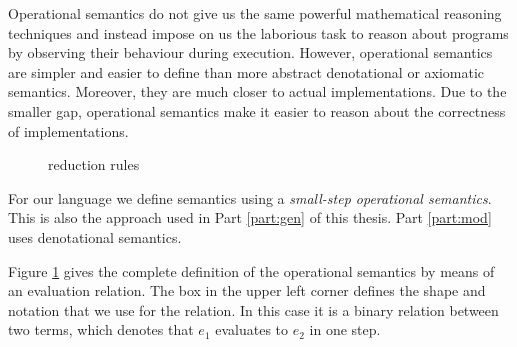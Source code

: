{Operational semantics do not give us the same powerful mathematical reasoning
techniques and instead impose on us the laborious task to reason about programs
by observing their behaviour during execution. However, operational semantics
are simpler and easier to define than more abstract denotational or axiomatic
semantics. Moreover, they are much closer to actual implementations. Due to the
smaller gap, operational semantics make it easier to reason about the
correctness of implementations.

\begin{figure}[t]
  \centering
  \caption{\stlcbool reduction rules}
  \label{fig:intro:stlcbooleval}
\end{figure}

For our \stlcbool language we define semantics using a \emph{small-step
  operational semantics}. This is also the approach used in Part \ref{part:gen}
of this thesis. Part \ref{part:mod} uses denotational semantics.

Figure \ref{fig:intro:stlcbooleval} gives the complete definition of the
operational semantics by means of an evaluation relation. The box in the upper
left corner  defines the shape and notation
that we use for the relation. In this case it is a binary relation between two
terms, which denotes that $e_1$ evaluates to $e_2$ in one step.

}
